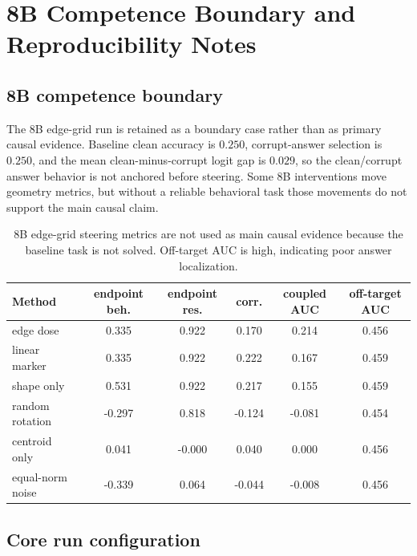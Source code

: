 \documentclass[11pt]{article}
\begin{document}
\section{8B Competence Boundary and Reproducibility Notes}

\subsection{8B competence boundary}

The 8B edge-grid run is retained as a boundary case rather than as primary causal evidence. Baseline clean accuracy is $0.250$, corrupt-answer selection is $0.250$, and the mean clean-minus-corrupt logit gap is $0.029$, so the clean/corrupt answer behavior is not anchored before steering. Some 8B interventions move geometry metrics, but without a reliable behavioral task those movements do not support the main causal claim.

\begin{table}[H]
\centering
\scriptsize
\setlength{\tabcolsep}{4pt}
\begin{tabular}{lccccc}
\toprule
Method & endpoint beh. & endpoint res. & corr. & coupled AUC & off-target AUC \\
\midrule
edge dose & 0.335 & 0.922 & 0.170 & 0.214 & 0.456 \\
linear marker & 0.335 & 0.922 & 0.222 & 0.167 & 0.459 \\
shape only & 0.531 & 0.922 & 0.217 & 0.155 & 0.459 \\
random rotation & -0.297 & 0.818 & -0.124 & -0.081 & 0.454 \\
centroid only & 0.041 & -0.000 & 0.040 & 0.000 & 0.456 \\
equal-norm noise & -0.339 & 0.064 & -0.044 & -0.008 & 0.456 \\
\bottomrule
\end{tabular}
\caption{8B edge-grid steering metrics are not used as main causal evidence because the baseline task is not solved. Off-target AUC is high, indicating poor answer localization.}
\label{tab:8b-boundary}
\end{table}

\subsection{Core run configuration}
\end{document}
